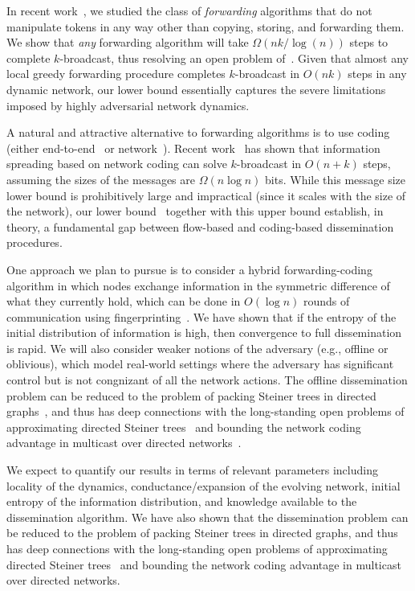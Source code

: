 In recent work~\cite{dutta+prs:dynamic}, we studied the class of {\em
  forwarding}\/ algorithms that do not manipulate tokens in any way
other than copying, storing, and forwarding them.  We show that {\em
  any}\/ forwarding algorithm will take $\Omega(nk/\log(n))$ steps to
complete $k$-broadcast, thus resolving an open problem
of~\cite{kuhn+lo:dynamic}.  Given that almost any local greedy
forwarding procedure completes $k$-broadcast in $O(nk)$ steps in any
dynamic network, our lower bound essentially captures the severe
limitations imposed by highly adversarial network dynamics.

A natural and attractive alternative to forwarding algorithms is to
use coding (either end-to-end~\cite{Byers02adigital,Shok06} or
network~\cite{ahlswede+cly:coding}).  Recent
work~\cite{haeupler:gossip,haeupler+k:dynamic} has shown that
information spreading based on network coding can solve $k$-broadcast
in $O(n+k)$ steps, assuming the sizes of the messages are $\Omega(n
\log n)$ bits.  While this message size lower bound is prohibitively
large and impractical (since it scales with the size of the network),
our lower bound~\cite{dutta+prs:dynamic} together with this upper
bound establish, in theory, a fundamental gap between flow-based and
coding-based dissemination procedures.

One approach we plan to pursue is to consider a hybrid
forwarding-coding algorithm in which nodes exchange information in the
symmetric difference of what they currently hold, which can be done in
$O(\log n)$ rounds of communication using
fingerprinting~\cite{mitzenmacher-2005-fastmixing}.  We have shown 
that if the entropy of the initial distribution of information
is high, then convergence to full dissemination is rapid.  We will
also consider weaker notions of the adversary (e.g., offline or
oblivious), which model real-world settings where the adversary has
significant control but is not congnizant of all the network actions.
The offline dissemination problem can be reduced to the problem of
packing Steiner trees in directed
graphs~\cite{cheriyan+s:steiner,dutta+prs:dynamic}, and thus has deep
connections with the long-standing open problems of approximating
directed Steiner
trees~\cite{charikar+ccdgg:steiner,zosin+k:steiner,halperin+k:steiner}
and bounding the network coding advantage in multicast over directed
networks~\cite{agarwal+c:coding,sanders+et:flow}.

We expect to quantify our results in terms of relevant parameters
including locality of the dynamics, conductance/expansion of the
evolving network, initial entropy of the information distribution, and
knowledge available to the dissemination algorithm.  We have also
shown that the dissemination problem can be reduced to the problem of
packing Steiner trees in directed graphs, and thus has deep
connections with the long-standing open problems of approximating
directed Steiner trees~\cite{charikar+ccdgg:steiner} and bounding the
network coding advantage in multicast over directed networks.

